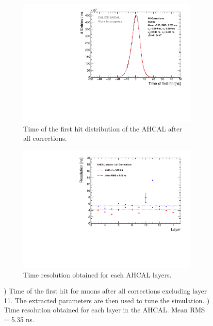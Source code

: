 \begin{figure}[htbp!]
	\begin{subfigure}[t]{0.5\textwidth}
		\centering
		\includegraphics[width=1\textwidth]{../Thesis_Plots/Timing/Muons/Plots/Timing_AllLayers.pdf}
		\caption{Time of the first hit distribution of the AHCAL after all corrections.}\label{fig:timing_muons}
	\end{subfigure}
	\hfill
	\begin{subfigure}[t]{0.5\textwidth}
		\centering
		\includegraphics[width=1\textwidth]{../Thesis_Plots/Timing/Muons/Plots/ResolutionPerModule_AllCorrection.pdf}
		\caption{Time resolution obtained for each AHCAL layers.}\label{fig:timing_reso_all_muons}
	\end{subfigure}
	\caption{) Time of the first hit for muons after all corrections excluding layer 11. The extracted parameters are then used to tune the simulation. ) Time resolution obtained for each layer in the AHCAL. Mean RMS = 5.35 ns.}
\end{figure}

